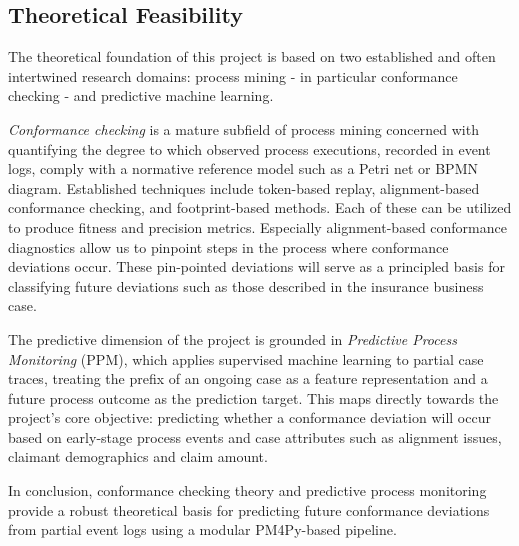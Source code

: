 \documentclass[12pt,a4paper]{article}
\begin{document}
\subsection{Theoretical Feasibility}

The theoretical foundation of this project is based on two established and often intertwined research domains: process mining - in particular conformance checking - and predictive machine learning.

\textit{Conformance checking} is a mature subfield of process mining concerned with quantifying the degree to which observed process executions, recorded in event logs, comply with a normative reference model such as a Petri net or BPMN diagram. Established techniques include token-based replay, alignment-based conformance checking, and footprint-based methods. Each of these can be utilized to produce fitness and precision metrics. Especially alignment-based conformance diagnostics allow us to pinpoint steps in the process where conformance deviations occur. These pin-pointed deviations will serve as a principled basis for classifying future deviations such as those described in the insurance business case.

The predictive dimension of the project is grounded in \textit{Predictive Process Monitoring} (PPM), which applies supervised machine learning to partial case traces, treating the prefix of an ongoing case as a feature representation and a future process outcome as the prediction target. This maps directly towards the project's core objective: predicting whether a conformance deviation will occur based on early-stage process events and case attributes such as alignment issues, claimant demographics and claim amount.

In conclusion, conformance checking theory and predictive process monitoring provide a robust theoretical basis for predicting future conformance deviations from partial event logs using a modular PM4Py-based pipeline.
\end{document}
